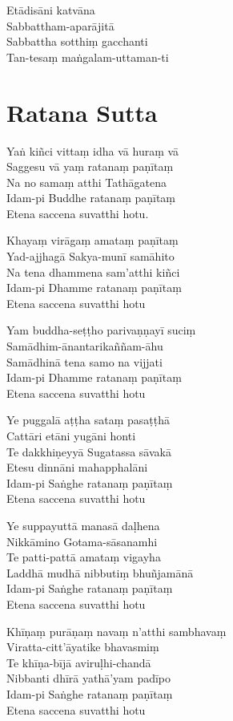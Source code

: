 Etādisāni katvāna\\
Sabbattham-aparājitā\\
Sabbattha sotthiṃ gacchanti\\
Tan-tesaṃ maṅgalam-uttaman-ti


\chapter{Ratana Sutta}

Yaṅ kiñci vittaṃ idha vā huraṃ vā\\
Saggesu vā yaṃ ratanaṃ paṇītaṃ\\
Na no samaṃ atthi Tathāgatena\\
Idam-pi Buddhe ratanaṃ paṇītaṃ\\
Etena saccena suvatthi hotu.

Khayaṃ virāgaṃ amataṃ paṇītaṃ\\
Yad-ajjhagā Sakya-munī samāhito\\
Na tena dhammena sam'atthi kiñci\\
Idam-pi Dhamme ratanaṃ paṇītaṃ\\
Etena saccena suvatthi hotu

Yam buddha-seṭṭho parivaṇṇayī suciṃ\\
Samādhim-ānantarikaññam-āhu\\
Samādhinā tena samo na vijjati\\
Idam-pi Dhamme ratanaṃ paṇītaṃ\\
Etena saccena suvatthi hotu

Ye puggalā aṭṭha sataṃ pasaṭṭhā\\
Cattāri etāni yugāni honti\\
Te dakkhiṇeyyā Sugatassa sāvakā\\
Etesu dinnāni mahapphalāni\\
Idam-pi Saṅghe ratanaṃ paṇītaṃ\\
Etena saccena suvatthi hotu

Ye suppayuttā manasā daḷhena\\
Nikkāmino Gotama-sāsanamhi\\
Te patti-pattā amataṃ vigayha\\
Laddhā mudhā nibbutiṃ bhuñjamānā\\
Idam-pi Saṅghe ratanaṃ paṇītaṃ\\
Etena saccena suvatthi hotu

Khīṇaṃ purāṇaṃ navaṃ n'atthi sambhavaṃ\\
Viratta-citt'āyatike bhavasmiṃ\\
Te khīṇa-bījā aviruḷhi-chandā\\
Nibbanti dhīrā yathā'yam padīpo\\
Idam-pi Saṅghe ratanaṃ paṇītaṃ\\
Etena saccena suvatthi hotu

